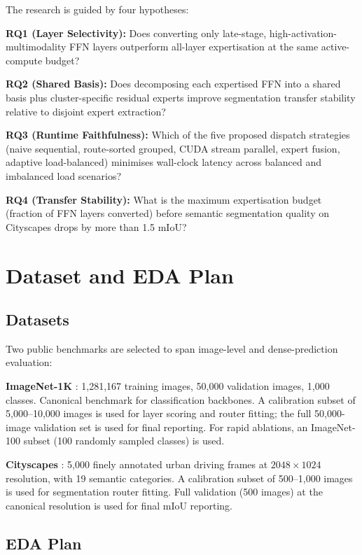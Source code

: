 \documentclass[conference]{IEEEtran}
\begin{document}
The research is guided by four hypotheses:

\textbf{RQ1 (Layer Selectivity):} Does converting only late-stage, high-activation-multimodality FFN layers outperform all-layer expertisation at the same active-compute budget?

\textbf{RQ2 (Shared Basis):} Does decomposing each expertised FFN into a shared basis plus cluster-specific residual experts improve segmentation transfer stability relative to disjoint expert extraction?

\textbf{RQ3 (Runtime Faithfulness):} Which of the five proposed dispatch strategies (naive sequential, route-sorted grouped, CUDA stream parallel, expert fusion, adaptive load-balanced) minimises wall-clock latency across balanced and imbalanced load scenarios?

\textbf{RQ4 (Transfer Stability):} What is the maximum expertisation budget (fraction of FFN layers converted) before semantic segmentation quality on Cityscapes drops by more than 1.5 mIoU?

\section{Dataset and EDA Plan}
\label{sec:data}

\subsection{Datasets}

Two public benchmarks are selected to span image-level and dense-prediction evaluation:

\textbf{ImageNet-1K} \cite{russakovsky2015imagenet}: 1,281,167 training images, 50,000 validation images, 1,000 classes. Canonical benchmark for classification backbones. A calibration subset of 5,000--10,000 images is used for layer scoring and router fitting; the full 50,000-image validation set is used for final reporting. For rapid ablations, an ImageNet-100 subset (100 randomly sampled classes) is used.

\textbf{Cityscapes} \cite{cordts2016cityscapes}: 5,000 finely annotated urban driving frames at $2048 \times 1024$ resolution, with 19 semantic categories. A calibration subset of 500--1,000 images is used for segmentation router fitting. Full validation (500 images) at the canonical resolution is used for final mIoU reporting.

\subsection{EDA Plan}
\end{document}
